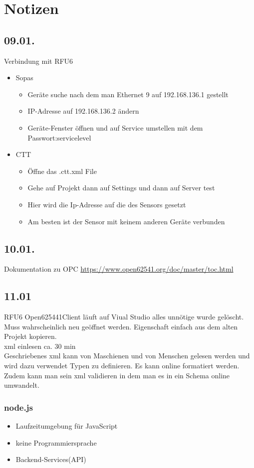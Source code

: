 \section{Notizen}

\subsection{09.01.}

Verbindung mit RFU6
\begin{itemize}
    \item Sopas
    \begin{itemize}
        \item [] Geräte suche nach dem man Ethernet 9 auf 192.168.136.1 gestellt
        \item [] IP-Adresse auf 192.168.136.2 ändern
        \item [] Geräte-Fenster öffnen und auf Service umstellen mit dem Passwort:servicelevel
    \end{itemize}
    \item CTT
    \begin{itemize}
        \item [] Öffne das .ctt.xml File
        \item [] Gehe auf Projekt dann auf Settings und dann auf Server test
        \item [] Hier wird die Ip-Adresse auf die des Sensors gesetzt
        \item [] Am besten ist der Sensor mit keinem anderen Geräte verbunden
    \end{itemize}
\end{itemize}

\subsection{10.01.}
Dokumentation zu OPC \url{https://www.open62541.org/doc/master/toc.html}

\subsection{11.01}
RFU6 Open625441Client läuft auf Viual Studio alles unnötige wurde gelöscht. 
Muss wahrscheinlich neu geöffnet werden. Eigenschaft einfach aus dem alten Projekt kopieren.\\
xml einlesen ca. 30 min \\
Geschriebenes xml kann von Maschienen und von Menschen gelesen werden und wird dazu verwendet Typen zu definieren. 
Es kann online formatiert werden. Zudem kann man sein xml validieren in dem man es in ein Schema online umwandelt.\\

\subsubsection*{node.js}
\begin{itemize}
    \item Laufzeitumgebung für JavaScript
    \item keine Programmiersprache
    \item Backend-Services(API)
\end{itemize}



